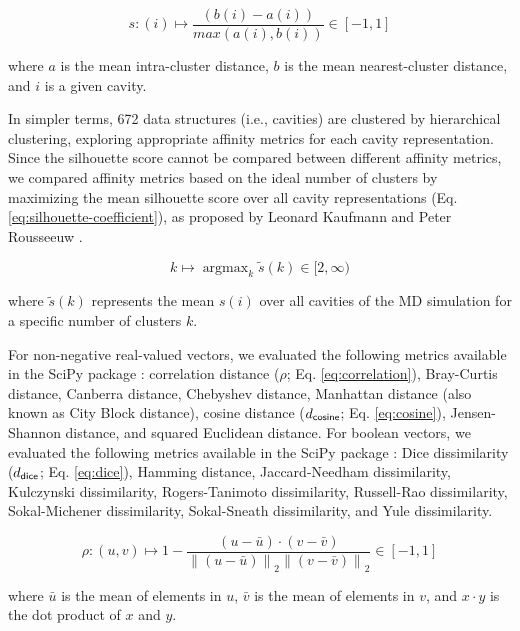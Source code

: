 \documentclass[Ingles]{phdthesis}
\DeclareMathOperator*{\argmax}{argmax}
\def\ie{i.e.\onedot}
\begin{document}
\begin{equation}
  s \colon (i) \mapsto \frac{(b(i) - a(i))}{max(a(i), b(i))} \in [-1, 1]
  \label{eq:silhouette}
\end{equation}

\noindent where $a$ is the mean intra-cluster distance, $b$ is the mean nearest-cluster distance, and $i$ is a given cavity.

In simpler terms, 672 data structures (\ie, cavities) are clustered by hierarchical clustering, exploring appropriate affinity metrics for each cavity representation. Since the silhouette score cannot be compared between different affinity metrics, we compared affinity metrics based on the ideal number of clusters by maximizing the mean silhouette score over all cavity representations (Eq. \ref{eq:silhouette-coefficient}), as proposed by Leonard Kaufmann and Peter Rousseeuw \cite{kaufman1990}.

\begin{equation}
  k \mapsto \argmax_k \tilde{s}(k) \in [2,\infty)
  \label{eq:silhouette-coefficient}
\end{equation}

\noindent where $\tilde{s}(k)$ represents the mean $s(i)$ over all cavities of the \acs{MD} simulation for a specific number of clusters $k$.

For non-negative real-valued vectors, we evaluated the following metrics available in the SciPy package \cite{scipy}: correlation distance ($\rho$; Eq. \ref{eq:correlation}), Bray-Curtis distance, Canberra distance, Chebyshev distance, Manhattan distance (also known as City Block distance), cosine distance ($d_{\sf cosine}$; Eq. \ref{eq:cosine}), Jensen-Shannon distance, and squared Euclidean distance. For boolean vectors, we evaluated the following metrics available in the SciPy package \cite{scipy}: Dice dissimilarity ($d_{\sf dice}$; Eq. \ref{eq:dice}), Hamming distance, Jaccard-Needham dissimilarity, Kulczynski dissimilarity, Rogers-Tanimoto dissimilarity, Russell-Rao dissimilarity, Sokal-Michener dissimilarity, Sokal-Sneath dissimilarity, and Yule dissimilarity.

\begin{equation}
  \rho \colon (u,v) \mapsto 1 - \frac{(u - \bar{u}) \cdot (v - \bar{v})}{{\|(u - \bar{u})\|}_2 {\|(v - \bar{v})\|}_2} \in [-1, 1]
  \label{eq:correlation}
\end{equation}

\noindent where $\bar{u}$ is the mean of elements in $u$, $\bar{v}$ is the mean of elements in $v$, and $x \cdot y$ is the dot product of $x$ and $y$.
\end{document}
